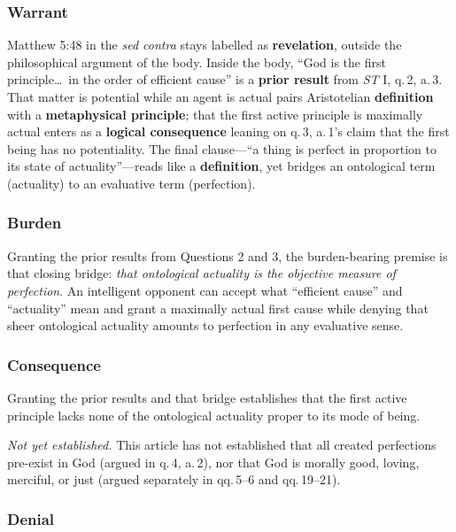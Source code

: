 \subsubsection*{Warrant}

Matthew 5:48 in the \emph{sed contra} stays labelled as \textbf{revelation}, outside the philosophical argument of the body. Inside the body, ``God is the first principle\dots\ in the order of efficient cause'' is a \textbf{prior result} from \emph{ST} I, q.\,2, a.\,3. That matter is potential while an agent is actual pairs Aristotelian \textbf{definition} with a \textbf{metaphysical principle}; that the first active principle is maximally actual enters as a \textbf{logical consequence} leaning on q.\,3, a.\,1's claim that the first being has no potentiality. The final clause---``a thing is perfect in proportion to its state of actuality''---reads like a \textbf{definition}, yet bridges an ontological term (actuality) to an evaluative term (perfection).

\subsubsection*{Burden}

Granting the prior results from Questions 2 and 3, the burden-bearing premise is that closing bridge: \emph{that ontological actuality is the objective measure of perfection}. An intelligent opponent can accept what ``efficient cause'' and ``actuality'' mean and grant a maximally actual first cause while denying that sheer ontological actuality amounts to perfection in any evaluative sense.

\subsubsection*{Consequence}

Granting the prior results and that bridge establishes that the first active principle lacks none of the ontological actuality proper to its mode of being.

\emph{Not yet established.} This article has not established that all created perfections pre-exist in God (argued in q.\,4, a.\,2), nor that God is morally good, loving, merciful, or just (argued separately in qq.\,5--6 and qq.\,19--21).

\subsubsection*{Denial}

